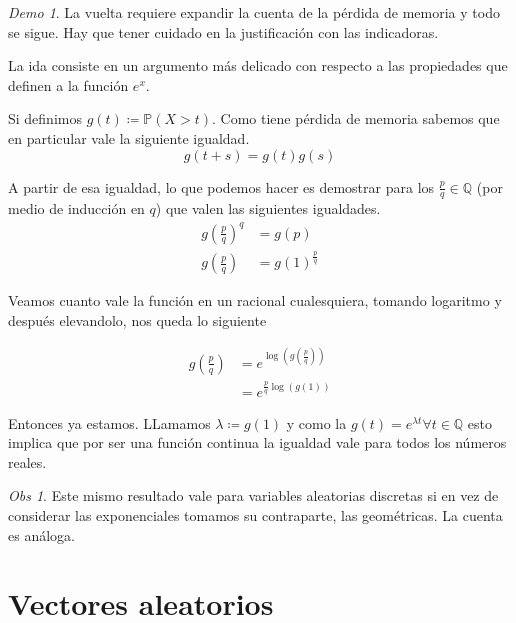 \documentclass[11pt]{article}
\theoremstyle{plain} %
\theoremstyle{definition}
\theoremstyle{remark}
\newtheorem{obs}{Obs}
\newtheorem*{demo}{Demo}
\def\Q{\mathbb{Q}}
\def\P{\mathbb{P}}
\def\vas{variables aleatorias }
\renewcommand\qed{\ding{110}}
\begin{document}
\begin{demo}
	
	La vuelta requiere expandir la cuenta de la p\'erdida de memoria y todo se sigue. Hay que tener cuidado en la justificaci\'on con las indicadoras.
	
	La ida consiste en un argumento m\'as delicado con respecto a las propiedades que definen a la funci\'on $e^x$. 
	
	Si definimos $g(t) \coloneqq \P(X>t) $. Como tiene p\'erdida de memoria sabemos que en particular vale la siguiente igualdad.
	\[g(t+s) = g(t)g(s)\]
	
	A partir de esa igualdad, lo que podemos hacer es demostrar para los $\frac{p}{q} \in \Q$ (por medio de inducci\'on en $q$) que valen las siguientes igualdades.
	\begin{align*}
		g\left( \frac{p}{q}\right) ^q &= g\left( p\right)  \\
		g\left( \frac{p}{q}\right)  &= g\left( 1\right) ^{\frac{p}{q}}
	\end{align*} 
	
	Veamos cuanto vale la funci\'on en un racional cualesquiera, tomando logaritmo y despu\'es elevandolo, nos queda lo siguiente
	
	\begin{align*}
		g\left( \frac{p}{q}\right)  &= e^{\log\left( g\left( \frac{p}{q}\right) \right) } \\
		&= e^{\frac{p}{q} \log\left( g\left( 1\right) \right) } 
	\end{align*}
	
	Entonces ya estamos. LLamamos $\lambda \coloneqq g(1)$ y como la $g(t) = e^{\lambda t} \forall t \in \Q$ esto implica que por ser una funci\'on continua la igualdad vale para todos los n\'umeros reales.
	
	\qed
		
	
\end{demo}

\begin{obs}
	Este mismo resultado vale para \vas discretas si en vez de considerar las exponenciales tomamos su contraparte, las geom\'etricas. La cuenta es an\'aloga.
\end{obs}



\bigskip

\section{Vectores aleatorios}
\end{document}
